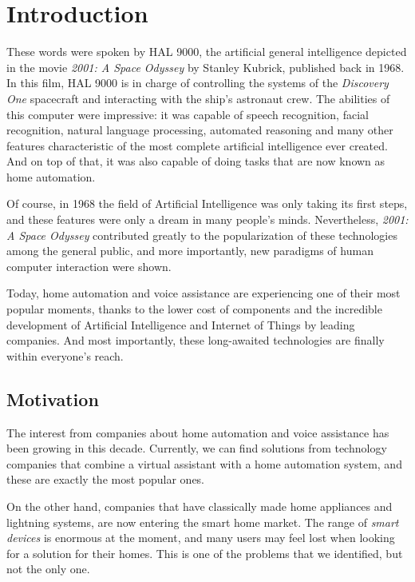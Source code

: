 \chapter{Introduction}


These words were spoken by HAL 9000, the artificial general intelligence depicted in the movie \textit{2001: A Space Odyssey}
by Stanley Kubrick, published back in 1968. In this film, HAL 9000 is in charge of controlling the systems of the
\textit{Discovery One} spacecraft and interacting with the ship's astronaut crew. The abilities of this computer were impressive: it
was capable of speech recognition, facial recognition, natural language processing, automated reasoning and many other features
characteristic of the most complete artificial intelligence ever created. And on top of that, it was also capable of doing tasks
that are now known as home automation.

Of course, in 1968 the field of Artificial Intelligence was only taking its first steps, and these features were only a dream in many
people's minds. Nevertheless, \textit{2001: A Space Odyssey} contributed greatly to the popularization of these technologies among
the general public, and more importantly, new paradigms of human computer interaction were shown.

Today, home automation and voice assistance are experiencing one of their most popular moments, thanks to the lower cost of components
and the incredible development of Artificial Intelligence and Internet of Things by leading companies. And most importantly, these
long-awaited technologies are finally within everyone's reach.

\section{Motivation}
The interest from companies about home automation and voice assistance has been growing in this decade. Currently, we can find
solutions from technology companies that combine a virtual assistant with a home automation system, and these are exactly the most
popular ones.

On the other hand, companies that have classically made home appliances and lightning systems, are now entering the smart home market.
The range of \textit{smart devices} is enormous at the moment, and many users may feel lost when looking for a solution for their homes.
This is one of the problems that we identified, but not the only one.

